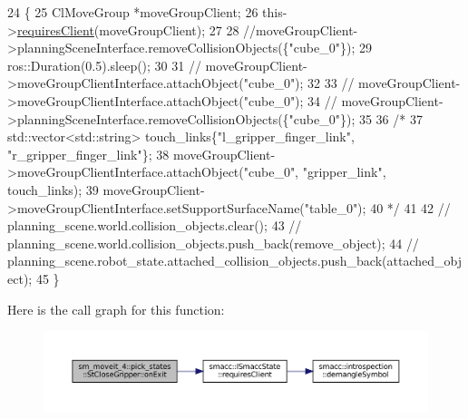 \begin{DoxyCode}
24    \{
25       ClMoveGroup *moveGroupClient;
26       this->\hyperlink{classsmacc_1_1ISmaccState_a7f95c9f0a6ea2d6f18d1aec0519de4ac}{requiresClient}(moveGroupClient);
27 
28       \textcolor{comment}{//moveGroupClient->planningSceneInterface.removeCollisionObjects(\{"cube\_0"\});}
29       ros::Duration(0.5).sleep();
30 
31       \textcolor{comment}{// moveGroupClient->moveGroupClientInterface.attachObject("cube\_0");}
32 
33       \textcolor{comment}{// moveGroupClient->moveGroupClientInterface.attachObject("cube\_0");}
34       \textcolor{comment}{// moveGroupClient->planningSceneInterface.removeCollisionObjects(\{"cube\_0"\});}
35 
36       \textcolor{comment}{/*}
37 \textcolor{comment}{         std::vector<std::string> touch\_links\{"l\_gripper\_finger\_link", "r\_gripper\_finger\_link"\};}
38 \textcolor{comment}{         moveGroupClient->moveGroupClientInterface.attachObject("cube\_0", "gripper\_link", touch\_links);}
39 \textcolor{comment}{         moveGroupClient->moveGroupClientInterface.setSupportSurfaceName("table\_0");}
40 \textcolor{comment}{         */}
41 
42       \textcolor{comment}{// planning\_scene.world.collision\_objects.clear();}
43       \textcolor{comment}{// planning\_scene.world.collision\_objects.push\_back(remove\_object);}
44       \textcolor{comment}{// planning\_scene.robot\_state.attached\_collision\_objects.push\_back(attached\_object);}
45    \}
\end{DoxyCode}
Here is the call graph for this function\+:
\nopagebreak
\begin{figure}[H]
\begin{center}
\leavevmode
\includegraphics[width=350pt]{structsm__moveit__4_1_1pick__states_1_1StCloseGripper_a427f4aec6a2173899b55e6a45ca28773_cgraph}
\end{center}
\end{figure}
\mbox{\label{structsm__moveit__4_1_1pick__states_1_1StCloseGripper_a5076328fb91d79beac4b1910aee86b05}} 
